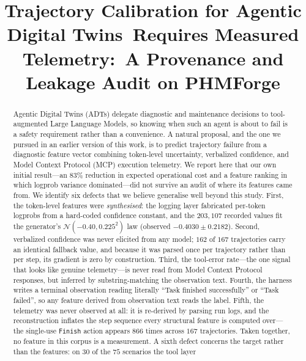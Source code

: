 \documentclass[conference]{IEEEtran}
\begin{document}
\title{Trajectory Calibration for Agentic Digital Twins\
Requires Measured Telemetry:\
A Provenance and Leakage Audit on PHMForge}

\author{
}

\maketitle

\begin{abstract}
Agentic Digital Twins (ADTs) delegate diagnostic and maintenance decisions to
tool-augmented Large Language Models, so knowing when such an agent is about to
fail is a safety requirement rather than a convenience. A natural proposal, and
the one we pursued in an earlier version of this work, is to predict trajectory
failure from a diagnostic feature vector combining token-level uncertainty,
verbalized confidence, and Model Context Protocol (MCP) execution telemetry. We
report here that our own initial result---an $83\%$ reduction in expected
operational cost and a feature ranking in which logprob variance dominated---did
not survive an audit of where its features came from. We identify six defects
that we believe generalise well beyond this study. First, the token-level
features were \emph{synthesised}: the logging layer fabricated per-token
logprobs from a hard-coded confidence constant, and the $203{,}107$ recorded
values fit the generator's $\mathcal{N}(-0.40, 0.225^2)$ law
(observed $-0.4030 \pm 0.2182$). Second, verbalized confidence was never
elicited from any model; $162$ of $167$ trajectories carry an identical
fallback value, and because it was parsed once per trajectory rather than per
step, its gradient is zero by construction. Third, the tool-error rate---the one
signal that looks like genuine telemetry---is never read from Model Context
Protocol responses, but inferred by substring-matching the observation text.
Fourth, the harness writes a terminal observation reading literally ``Task
finished successfully'' or ``Task failed'', so any feature derived from
observation text reads the label. Fifth, the telemetry was never observed at
all: it is re-derived by parsing run logs, and the reconstruction inflates the
step sequence every structural feature is computed over---the single-use
\texttt{Finish} action appears $866$ times across $167$ trajectories. Taken
together, no feature in this corpus is a measurement. A sixth defect concerns
the target rather than the features: on $30$ of the $75$ scenarios the tool layer

\end{abstract}
\end{document}
